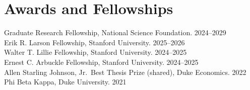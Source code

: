 \documentclass[11pt, letterpaper]{article}
\begin{document}
\section*{Awards and Fellowships}
Graduate Research Fellowship, National Science Foundation. \hfill 2024--2029 \\
Erik R. Larson Fellowship, Stanford University. \hfill 2025--2026 \\
Walter T. Lillie Fellowship, Stanford University. \hfill 2024--2025 \\
Ernest C. Arbuckle Fellowship, Stanford University. \hfill 2024--2025 \\
Allen Starling Johnson, Jr.\ Best Thesis Prize (shared), Duke Economics. \hfill 2022 \\
Phi Beta Kappa, Duke University. \hfill 2021
\end{document}
